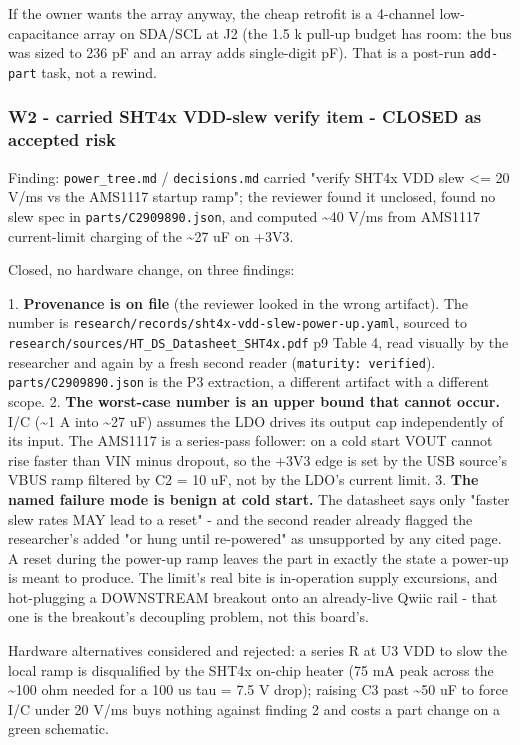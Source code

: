 \documentclass[11pt,a4paper]{article}
\begin{document}
If the owner wants the array anyway, the cheap retrofit is a 4-channel low-capacitance array on SDA/SCL at J2 (the 1.5 k pull-up budget has room: the bus was sized to 236 pF and an array adds single-digit pF). That is a post-run \texttt{add-part} task, not a rewind.

\subsubsection*{W2 - carried SHT4x VDD-slew verify item - CLOSED as accepted risk}
Finding: \texttt{power\_tree.md} / \texttt{decisions.md} carried "verify SHT4x VDD slew \textless{}= 20 V/ms vs the AMS1117 startup ramp"; the reviewer found it unclosed, found no slew spec in \texttt{parts/C2909890.json}, and computed \textasciitilde{}40 V/ms from AMS1117 current-limit charging of the \textasciitilde{}27 uF on +3V3.

Closed, no hardware change, on three findings:

1. \textbf{Provenance is on file} (the reviewer looked in the wrong artifact). The number is \texttt{research/records/sht4x-vdd-slew-power-up.yaml}, sourced to \texttt{research/sources/HT\_DS\_Datasheet\_SHT4x.pdf} p9 Table 4, read visually by the researcher and again by a fresh second reader (\texttt{maturity: verified}). \texttt{parts/C2909890.json} is the P3 extraction, a different artifact with a different scope. 2. \textbf{The worst-case number is an upper bound that cannot occur.} I/C (\textasciitilde{}1 A into \textasciitilde{}27 uF) assumes the LDO drives its output cap independently of its input. The AMS1117 is a series-pass follower: on a cold start VOUT cannot rise faster than VIN minus dropout, so the +3V3 edge is set by the USB source's VBUS ramp filtered by C2 = 10 uF, not by the LDO's current limit. 3. \textbf{The named failure mode is benign at cold start.} The datasheet says only "faster slew rates MAY lead to a reset" - and the second reader already flagged the researcher's added "or hung until re-powered" as unsupported by any cited page. A reset during the power-up ramp leaves the part in exactly the state a power-up is meant to produce. The limit's real bite is in-operation supply excursions, and hot-plugging a DOWNSTREAM breakout onto an already-live Qwiic rail - that one is the breakout's decoupling problem, not this board's.

Hardware alternatives considered and rejected: a series R at U3 VDD to slow the local ramp is disqualified by the SHT4x on-chip heater (75 mA peak across the \textasciitilde{}100 ohm needed for a 100 us tau = 7.5 V drop); raising C3 past \textasciitilde{}50 uF to force I/C under 20 V/ms buys nothing against finding 2 and costs a part change on a green schematic.
\end{document}
